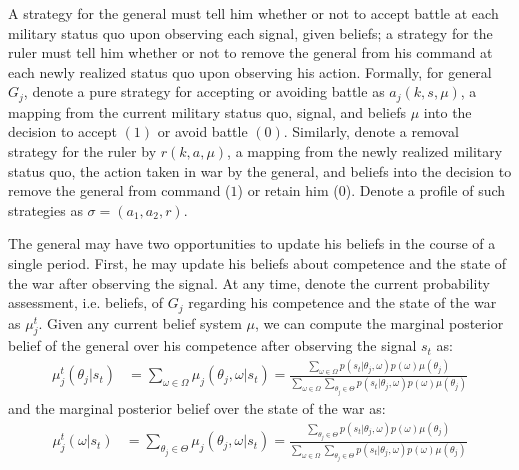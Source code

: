 \documentclass[11pt,]{article}
\begin{document}
A strategy for the general must tell him whether or not to accept battle at each military status quo upon observing each signal, given beliefs; a strategy for the ruler must tell him whether or not to remove the general from his command at each newly realized status quo upon observing his action.  Formally, for general $G_j$, denote a pure strategy for accepting or avoiding battle as $a_{j}(k,s,\mu)$, a mapping from the current military status quo, signal, and beliefs $\mu$ into the decision to accept $(1)$ or avoid battle $(0)$.  Similarly, denote a removal strategy for the ruler by $r(k,a,\mu)$, a mapping from the newly realized military status quo, the action taken in war by the general, and beliefs into the decision to remove the general from command ($1$) or retain him ($0$).  Denote a profile of such strategies as $\sigma=(a_{1},a_{2},r)$.  



The general may have two opportunities to update his beliefs in the course of a single period.  First, he may update his beliefs about competence and the state of the war after observing the signal.  At any time, denote the current probability assessment, i.e. beliefs, of $G_j$ regarding his competence and the state of the war as $\mu^t_{j}$.  Given any current belief system $\mu$, we can compute the marginal posterior belief of the general over his competence after observing the signal $s_t$ as:
\begin{align*}
\nonumber\mu^t_{j}(\theta_{j}|s_t)&=\sum_{\omega\in\Omega}\mu_{j}(\theta_{j},\omega|s_t)=\frac{\sum_{\omega\in\Omega}p(s_t| \theta_{j},\omega)p(\omega)\mu(\theta_{j})}{\sum_{\omega\in\Omega}\sum_{\theta_{j}\in\Theta}p(s_t|\theta_{j},\omega)p(\omega)\mu(\theta_{j})}
\end{align*}and the marginal posterior belief over the state of the war as:
\begin{align*}
\nonumber\mu^t_{j}(\omega|s_t)&=\sum_{\theta_{j}\in\Theta}\mu_{j}(\theta_{j},\omega|s_t)=\frac{\sum_{\theta_{j}\in\Theta}p(s_t|\theta_{j},\omega)p(\omega)\mu(\theta_{j})}{\sum_{\omega\in\Omega}\sum_{\theta_{j}\in\Theta}p(s_t|\theta_{j},\omega)p(\omega)\mu(\theta_{j})}
\end{align*}
\end{document}
